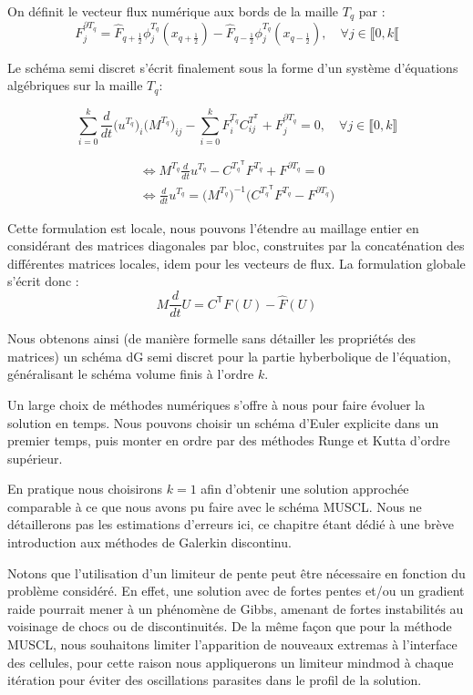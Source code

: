 On définit le vecteur flux numérique aux bords de la maille $T_q$ par :
$$F^{\partial T_q}_j = \widehat{F}_{q+\frac{1}{2}}\phi_j^{T_q}(x_{q+\frac{1}{2}}) - \widehat{F}_{q-\frac{1}{2}}\phi_j^{T_q}(x_{q-\frac{1}{2}}), \quad \forall j\in \llbracket 0,k \llbracket $$

Le schéma semi discret s'écrit finalement sous la forme d'un système d'équations algébriques sur la maille $T_q$:

$$\sum_{i=0}^{k} \frac{d}{dt}\big(u^{T_q}\big)_i \big(M^{T_q}\big)_{ij} - \sum_{i = 0}^{k} F^{T_q}_i C^{T^\mathsf{T}}_{ij} + F^{\partial T_q}_j = 0, \quad \forall j \in \llbracket 0,k \rrbracket $$

\begin{equation*}
\begin{split}
    \Leftrightarrow M^{T_q} \frac{d}{dt}u^{T_q} - C^{{T_q}^\mathsf{T}} F^{T_q} + F^{\partial T_q} = 0 \\
    \Leftrightarrow \frac{d}{dt}u^{T_q} = \Big(M^{T_q}\Big)^{-1} \Big( C^{{T_q}^\mathsf{T}} F^{T_q} - F^{\partial T_q} \Big)
\end{split}
\end{equation*}

Cette formulation est locale, nous pouvons l'étendre au maillage entier en considérant des matrices diagonales par bloc, construites par la concaténation des différentes matrices locales, idem pour les vecteurs de flux.
La formulation globale s'écrit donc :
$$M\frac{d}{dt}U = C^{\mathsf{T}}F(U) - \widehat{F}(U)$$

Nous obtenons ainsi (de manière formelle sans détailler les propriétés des matrices) un schéma dG semi discret pour la partie hyberbolique de l'équation, généralisant le schéma volume finis à l'ordre $k$.

Un large choix de méthodes numériques s'offre à nous pour faire évoluer la solution en temps. Nous pouvons choisir un schéma d'Euler explicite dans un premier temps, puis monter en ordre par des méthodes Runge et Kutta d'ordre supérieur.

En pratique nous choisirons $k = 1$ afin d'obtenir une solution approchée comparable à ce que nous avons pu faire avec le schéma MUSCL. Nous ne détaillerons pas les estimations d'erreurs ici, ce chapitre étant dédié à une brève introduction aux méthodes de Galerkin discontinu.

Notons que l'utilisation d'un limiteur de pente peut être nécessaire en fonction du problème considéré. En effet, une solution avec de fortes pentes et/ou un gradient raide pourrait mener à un phénomène de Gibbs, amenant de fortes instabilités
au voisinage de chocs ou de discontinuités. De la même façon que pour la méthode MUSCL, nous souhaitons limiter l'apparition de nouveaux extremas à l'interface des cellules, pour cette raison nous appliquerons un limiteur mindmod à chaque itération pour éviter des oscillations parasites
dans le profil de la solution.


